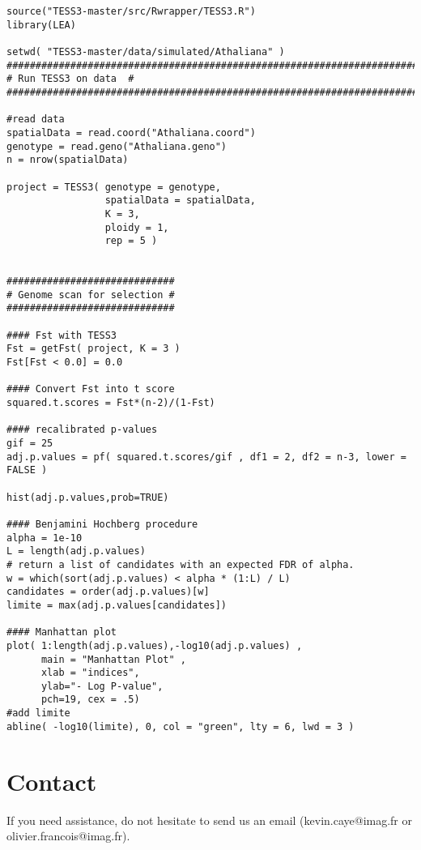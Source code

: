 \documentclass[10pt,a4paper]{article}
\begin{document}

\begin{Verbatim}[frame=single]
source("TESS3-master/src/Rwrapper/TESS3.R")
library(LEA)

setwd( "TESS3-master/data/simulated/Athaliana" )
###########################################################################
# Run TESS3 on data  #
###########################################################################

#read data
spatialData = read.coord("Athaliana.coord")
genotype = read.geno("Athaliana.geno")
n = nrow(spatialData)

project = TESS3( genotype = genotype, 
                 spatialData = spatialData, 
                 K = 3, 
                 ploidy = 1, 
                 rep = 5 )


#############################
# Genome scan for selection #
#############################

#### Fst with TESS3 
Fst = getFst( project, K = 3 )
Fst[Fst < 0.0] = 0.0

#### Convert Fst into t score
squared.t.scores = Fst*(n-2)/(1-Fst)

#### recalibrated p-values
gif = 25
adj.p.values = pf( squared.t.scores/gif , df1 = 2, df2 = n-3, lower = FALSE )

hist(adj.p.values,prob=TRUE)

#### Benjamini Hochberg procedure
alpha = 1e-10
L = length(adj.p.values)
# return a list of candidates with an expected FDR of alpha.
w = which(sort(adj.p.values) < alpha * (1:L) / L)
candidates = order(adj.p.values)[w]
limite = max(adj.p.values[candidates])

#### Manhattan plot 
plot( 1:length(adj.p.values),-log10(adj.p.values) , 
      main = "Manhattan Plot" , 
      xlab = "indices", 
      ylab="- Log P-value", 
      pch=19, cex = .5) 
#add limite
abline( -log10(limite), 0, col = "green", lty = 6, lwd = 3 )
\end{Verbatim}

\section{Contact}
If you need assistance, do not hesitate to send us an email (kevin.caye@imag.fr or olivier.francois@imag.fr). 



\end{document}
